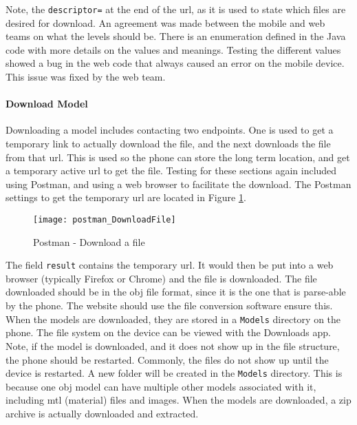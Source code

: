                 Note, the \texttt{descriptor=} at the end of the url, as it is used to state which files are desired for download.  An agreement was made between the mobile and web teams on what the levels should be.  There is an enumeration defined in the Java code with more details on the values and meanings.  Testing the different values showed a bug in the web code that always caused an error on the mobile device.  This issue was fixed by the web team.
            
            \paragraph{Download Model}

                Downloading a model includes contacting two endpoints.  One is used to get a temporary link to actually download the file, and the next downloads the file from that url.  This is used so the phone can store the long term location, and get a temporary active url to get the file.  Testing for these sections again included using Postman, and using a web browser to facilitate the download.  The Postman settings to get the temporary url are located in Figure \ref{fig:mobilePostmanDownloadFile}.

                \begin{figure}[H]
                    \texttt{[image: postman\_DownloadFile]}
                    \centering
                    \caption{Postman - Download a file}
                    \label{fig:mobilePostmanDownloadFile}
                \end{figure}

                The field \texttt{result} contains the temporary url.  It would then be put into a web browser (typically Firefox or Chrome) and the file is downloaded.  The file downloaded should be in the obj file format, since it is the one that is parse-able by the phone.  The website should use the file conversion software ensure this.  When the models are downloaded, they are stored in a \texttt{Models} directory on the phone.  The file system on the device can be viewed with the Downloads app.  Note, if the model is downloaded, and it does not show up in the file structure, the phone should be restarted.  Commonly, the files do not show up until the device is restarted.  A new folder will be created in the \texttt{Models} directory.  This is because one obj model can have multiple other models associated with it, including mtl (material) files and images.  When the models are downloaded, a zip archive is actually downloaded and extracted.

